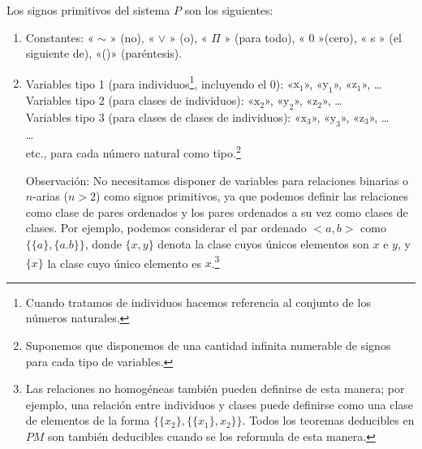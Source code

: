 Los signos primitivos del sistema $P$ son los siguientes:
\begin{enumerate}
    \item Constantes: « $\sim$ » (no), « $\vee$ » (o), « $\Pi$ » (para todo), « $0$ »(cero), « s » (el siguiente de), «()» (paréntesis).
    \item Variables tipo 1 (para individuos\footnote{Cuando tratamos de individuos hacemos referencia al conjunto de los números naturales.}, 
            incluyendo el 0):  «$\text{x}_1$», «$\text{y}_1$», «$\text{z}_1$», \dots \\
          Variables tipo 2 (para clases de individuos): «$\text{x}_2$», «$\text{y}_2$», «$\text{z}_2$», \dots \\
          Variables tipo 3 (para clases de clases de individuos): «$\text{x}_3$», «$\text{y}_3$», «$\text{z}_3$», \dots \\
          \dots \\
          etc., para cada número natural como tipo.\footnote{Suponemos que disponemos de una cantidad infinita numerable de signos para cada tipo de variables.}
\end{enumerate}
\begin{itemize}
    \item[Observación:] No necesitamos disponer de variables para relaciones binarias o $n$-arias ($n>2$) como signos primitivos, ya que podemos definir
                        las relaciones como clase de pares ordenados y los pares ordenados a su vez como clases de clases. Por ejemplo, podemos considerar
                        el par ordenado $<a,b>$ como $\{\{a\}, \{a.b\}\}$, donde $\{x,y\}$ denota la clase cuyos únicos elementos son $x$ e $y$, y $\{x\}$ 
                        la clase cuyo único elemento es $x$.\footnote{Las relaciones no homogéneas también pueden definirse de esta manera; por ejemplo, una
                        relación entre individuos y clases puede definirse como una clase de elementos de la forma $\{\{x_2\}, \{\{x_1\},x_2\}\}$. Todos los 
                        teoremas deducibles en $PM$ son también deducibles cuando se los reformula de esta manera.}
\end{itemize}
                           
